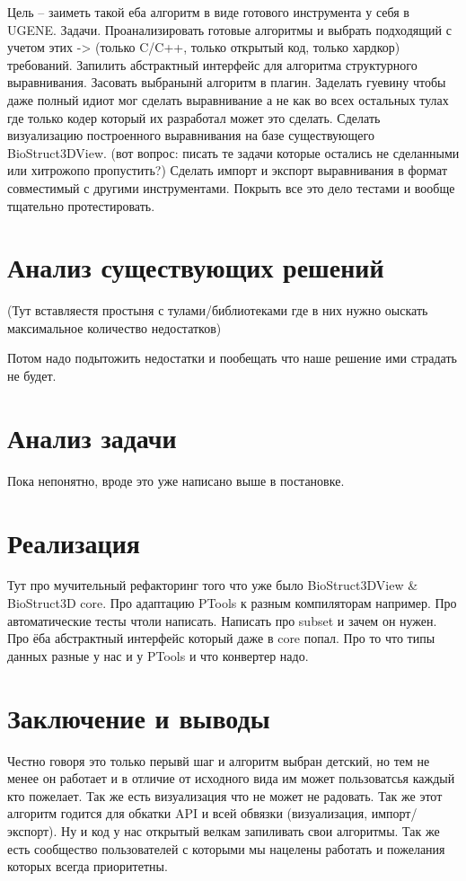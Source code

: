 \documentclass[a4paper, 14pt, titlepage, utf8]{extarticle}
\begin{document}
Цель -- заиметь такой еба алгоритм в виде готового инструмента у себя в UGENE. 
Задачи.
Проанализировать готовые алгоритмы и выбрать подходящий с учетом этих -> (только C/C++, только открытый код, только хардкор) требований. Запилить абстрактный интерфейс для алгоритма структурного выравнивания. Засовать выбранынй алгоритм в плагин. Заделать гуевину чтобы даже полный идиот мог сделать выравнивание а не как во всех остальных тулах где только кодер который их разработал может это сделать. Сделать визуализацию построенного выравнивания на базе существующего BioStruct3DView. (вот вопрос: писать те задачи которые остались не сделанными или хитрожопо пропустить?) Сделать импорт и экспорт выравнивания в формат совместимый с другими инструментами. Покрыть все это дело тестами и вообще тщательно протестировать.

\section{Анализ существующих решений}

(Тут вставляестя простыня с тулами/библиотеками где в них нужно оыскать максимальное количество недостатков)

Потом надо подытожить недостатки и пообещать что наше решение ими страдать не будет.

\section{Анализ задачи}

Пока непонятно, вроде это уже написано выше в постановке.

\section{Реализация}

Тут про мучительный рефакторинг того что уже было BioStruct3DView \& BioStruct3D core.
Про адаптацию PTools к разным компиляторам например.
Про автоматические тесты чтоли написать.
Написать про subset и зачем он нужен. 
Про ёба абстрактный интерфейс который даже в core попал.
Про то что типы данных разные у нас и у PTools и что конвертер надо.

\section{Заключение и выводы}

Честно говоря это только перывй шаг и алгоритм выбран детский, но тем не менее он работает и в отличие от исходного вида им может пользоватсья каждый кто пожелает. Так же есть визуализация что не может не радовать. Так же этот алгоритм годится для обкатки API и всей обвязки (визуализация, импорт/экспорт). Ну и код у нас открытый велкам запиливать свои алгоритмы. Так же есть сообщество пользователей с которыми мы нацелены работать и пожелания которых всегда приоритетны. 
\end{document}

